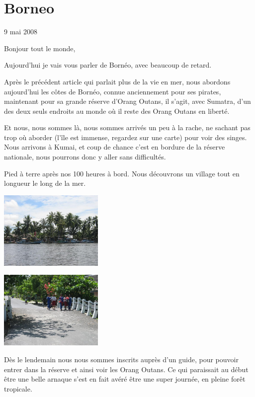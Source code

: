 \section{Borneo}

9 mai 2008

\begin{multicols}{2}

Bonjour tout le monde,

Aujourd'hui je vais vous parler de Bornéo, avec beaucoup de retard.

Après le précédent article qui parlait plus de la vie en mer, nous abordons aujourd'hui les côtes de Bornéo, connue anciennement pour ses pirates, maintenant pour sa grande réserve d'Orang Outans, il s'agit, avec Sumatra, d'un des deux seuls endroits au monde où il reste des Orang Outans en liberté.

Et nous, nous sommes là, nous sommes arrivés un peu à la rache, ne sachant pas trop où aborder (l'île est immense, regardez sur une carte) pour voir des singes. Nous arrivons à Kumai, et coup de chance c'est en bordure de la réserve nationale, nous pourrons donc y aller sans difficultés.

Pied à terre après nos 100 heures à bord. Nous découvrons un village tout en longueur le long de la mer.

\smallbreak
\hspace*{-0.65cm}
\includegraphics[width=5cm]{articles/Borneo/1210331303F4qq.jpg}
\smallbreak

\smallbreak
\hspace*{-0.65cm}
\includegraphics[width=5cm]{articles/Borneo/1210331297ISJ9.jpg}
\smallbreak

Dès le lendemain nous nous sommes inscrits auprès d'un guide, pour pouvoir entrer dans la réserve et ainsi voir les Orang Outans. Ce qui paraissait au début être une belle arnaque s'est en fait avéré être une super journée, en pleine forêt tropicale.


\end{multicols}
